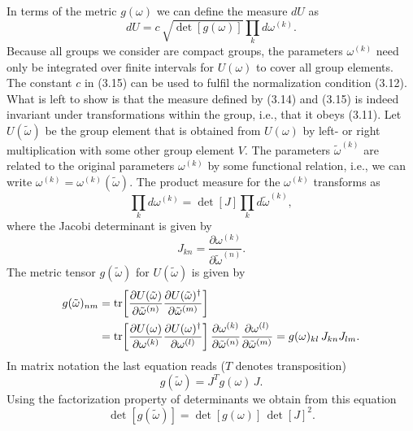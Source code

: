 In terms of the metric $g(\omega)$ we can define the measure $dU$ as
\begin{equation}
  dU = c\,\sqrt{\det[g(\omega)]}\prod_k d\omega^{(k)}.
\end{equation}
Because all groups we consider are compact groups, the parameters
$\omega^{(k)}$ need only be integrated over finite intervals for $U(\omega)$ to
cover all group elements. The constant $c$ in (3.15) can be used to fulfil the
normalization condition (3.12). What is left to show is that the measure
defined by (3.14) and (3.15) is indeed invariant under transformations within
the group, i.e., that it obeys (3.11). Let $U(\tilde\omega)$ be the group
element that is obtained from $U(\omega)$ by left- or right multiplication with
some other group element $V$. The parameters $\tilde\omega^{(k)}$ are related
to the original parameters $\omega^{(k)}$ by some functional relation, i.e., we
can write $\omega^{(k)} = \omega^{(k)}(\tilde\omega)$. The product measure for
the $\omega^{(k)}$ transforms as
\begin{equation}
  \prod_k d\omega^{(k)} = \det[J]\prod_k d\tilde\omega^{(k)},
\end{equation}
where the Jacobi determinant is given by
\begin{equation}
  J_{kn} = \frac{\partial \omega^{(k)}}{\partial \tilde\omega^{(n)}}.
\end{equation}
The metric tensor $g(\tilde\omega)$ for $U(\tilde\omega)$ is given by
\begin{equation}
\begin{split}
  g(\tilde\omega)_{nm} &= \operatorname{tr}\!\left[
    \frac{\partial U(\tilde\omega)}{\partial \tilde\omega^{(n)}}
    \frac{\partial U(\tilde\omega)^{\dagger}}{\partial \tilde\omega^{(m)}}
  \right] \\
  &= \operatorname{tr}\!\left[
    \frac{\partial U(\omega)}{\partial \omega^{(k)}}
    \frac{\partial U(\omega)^{\dagger}}{\partial \omega^{(l)}}
  \right]\frac{\partial \omega^{(k)}}{\partial \tilde\omega^{(n)}}
   \frac{\partial \omega^{(l)}}{\partial \tilde\omega^{(m)}}
  = g(\omega)_{kl}\,J_{kn} J_{lm}.
\end{split}
\end{equation}
In matrix notation the last equation reads ($T$ denotes transposition)
\begin{equation}
  g(\tilde\omega) = J^T g(\omega)\,J .
\end{equation}
Using the factorization property of determinants we obtain from this equation
\begin{equation}
  \det[g(\tilde\omega)] = \det[g(\omega)]\,\det[J]^2 .
\end{equation}
